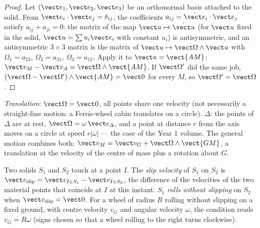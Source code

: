 \begin{proof}
Let $(\vect e_1, \vect e_2, \vect e_3)$ be an orthonormal basis attached to
the solid. From $\vect e_i\cdot\vect e_j = \delta_{ij}$, the coefficients
$a_{ij} = \dot{\vect e}_i\cdot\vect e_j$ satisfy $a_{ij} + a_{ji} = 0$: the
matrix of the map $\vect u \mapsto \dot{\vect u}$ (for $\vect u$ fixed in
the solid, $\vect u = \sum u_i\vect e_i$ with constant $u_i$) is
antisymmetric, and an antisymmetric $3\times3$ matrix is the matrix of
$\vect u \mapsto \vect\Omega\wedge\vect u$ with $\Omega_1 = a_{23}$,
$\Omega_2 = a_{31}$, $\Omega_3 = a_{12}$. Apply it to $\vect u =
\vect{AM}$: $\vect v_M - \vect v_A = \vect\Omega\wedge\vect{AM}$. If
$\vect\Omega'$ did the same job, $(\vect\Omega - \vect\Omega')\wedge
\vect{AM} = \vect 0$ for every $M$, so $\vect\Omega' = \vect\Omega$.
\end{proof}

\begin{remark}\label{rem:b2:rigid-body-mechanics:motions}
\emph{Translation}: $\vect\Omega = \vect 0$, all points share one
velocity (not necessarily a straight-line motion: a Ferris-wheel cabin
translates on a circle). \emph{} $\Delta$:
the points of $\Delta$ are at rest, $\vect\Omega = \omega\,\vect e_\Delta$,
and a point at distance $r$ from the axis moves on a circle at speed
$r|\omega|$ --- the case of the Year 1 volume. The general motion
combines both: $\vect v_M = \vect v_G + \vect\Omega\wedge\vect{GM}$, a
translation at the velocity of the centre of mass plus a rotation about
$G$.
\end{remark}

\begin{definition}\label{def:b2:rigid-body-mechanics:rolling}
Two solids $S_1$ and $S_2$ touch at a point $I$. The \emph{slip
velocity} of $S_1$ on $S_2$ is $\vect v_{\text{slip}} = \vect v_{I \in S_1}
- \vect v_{I \in S_2}$, the difference of the velocities of the two
material points that coincide at $I$ at this instant. $S_1$ \emph{rolls
without slipping} on $S_2$ when $\vect v_{\text{slip}} = \vect 0$. For a
wheel of radius $R$ rolling without slipping on a fixed ground, with
centre velocity $v_G$ and angular velocity $\omega$, the condition reads
$v_G = R\omega$ (signs chosen so that a wheel rolling to the right turns
clockwise).
\end{definition}

